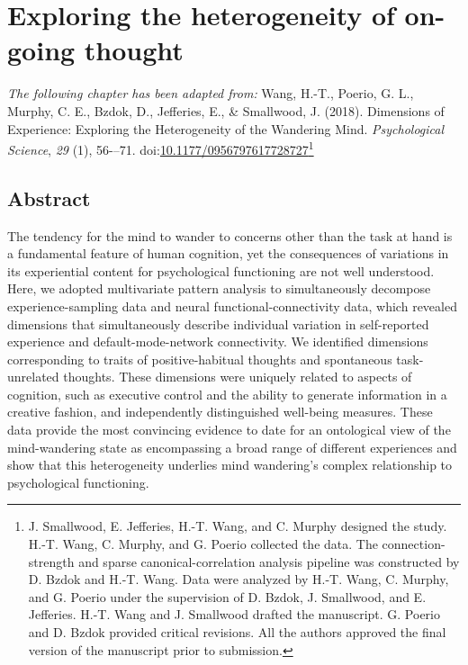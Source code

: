 \chapter{Exploring the heterogeneity of on-going thought}
\label{ch:study1}
\setcounter{equation}{0}
\textit{The following chapter has been adapted from:} Wang, H.-T., Poerio, G. L., Murphy, C. E., Bzdok, D., Jefferies, E., \& Smallwood, J. (2018). Dimensions of Experience: Exploring the Heterogeneity of the Wandering Mind. \textit{Psychological Science}, \textit{29} (1), 56-–71. doi:\url{10.1177/0956797617728727}\footnote{
J. Smallwood, E. Jefferies, H.-T. Wang, and C. Murphy designed the study. H.-T. Wang, C. Murphy, and G. Poerio collected the data. The connection-strength and sparse canonical-correlation analysis pipeline was constructed by D. Bzdok and H.-T. Wang. Data were analyzed by H.-T. Wang, C. Murphy, and G. Poerio under the supervision of D. Bzdok, J. Smallwood, and E. Jefferies. H.-T. Wang and J. Smallwood drafted the manuscript. G. Poerio and D. Bzdok provided critical revisions. All the authors approved the final version of the manuscript prior to submission.
}
\section{Abstract}
The tendency for the mind to wander to concerns other than the task at hand is a fundamental feature of human cognition, yet the consequences of variations in its experiential content for psychological functioning are not well understood. Here, we adopted multivariate pattern analysis to simultaneously decompose experience-sampling data and neural functional-connectivity data, which revealed dimensions that simultaneously describe individual variation in self-reported experience and default-mode-network connectivity. We identified dimensions corresponding to traits of positive-habitual thoughts and spontaneous task-unrelated thoughts. These dimensions were uniquely related to aspects of cognition, such as executive control and the ability to generate information in a creative fashion, and independently distinguished well-being measures. These data provide the most convincing evidence to date for an ontological view of the mind-wandering state as encompassing a broad range of different experiences and show that this heterogeneity underlies mind wandering's complex relationship to psychological functioning.


